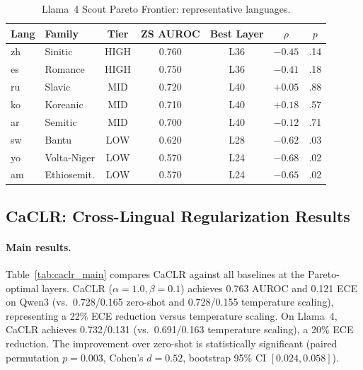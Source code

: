 \documentclass[11pt,a4paper]{article}
\begin{document}
\begin{table}[t]
\centering
\caption{Llama~4 Scout Pareto Frontier: representative languages.}
\label{tab:llama_pareto}
\small
\begin{tabular}{llccccc}
\toprule
\textbf{Lang} & \textbf{Family} & \textbf{Tier} & \textbf{ZS AUROC} & \textbf{Best Layer} & \textbf{$\rho$} & \textbf{$p$} \\
\midrule
zh & Sinitic    & HIGH & 0.760 & L36 & $-0.45$ & .14 \\
es & Romance    & HIGH & 0.750 & L36 & $-0.41$ & .18 \\
ru & Slavic     & MID  & 0.720 & L40 & $+0.05$ & .88 \\
ko & Koreanic   & MID  & 0.710 & L40 & $+0.18$ & .57 \\
ar & Semitic    & MID  & 0.700 & L40 & $-0.12$ & .71 \\
sw & Bantu      & LOW  & 0.620 & L28 & $-0.62$ & .03 \\
yo & Volta-Niger& LOW  & 0.570 & L24 & $-0.68$ & .02 \\
am & Ethiosemit.& LOW  & 0.570 & L24 & $-0.65$ & .02 \\
\bottomrule
\end{tabular}
\end{table}

\subsection{CaCLR: Cross-Lingual Regularization Results}
\label{sec:caclr_results}

\paragraph{Main results.}
Table~\ref{tab:caclr_main} compares CaCLR against all baselines at the Pareto-optimal layers.
CaCLR ($\alpha = 1.0, \beta = 0.1$) achieves 0.763 AUROC and 0.121 ECE on Qwen3 (vs.\ 0.728/0.165 zero-shot and 0.728/0.155 temperature scaling), representing a 22\% ECE reduction versus temperature scaling.
On Llama~4, CaCLR achieves 0.732/0.131 (vs.\ 0.691/0.163 temperature scaling), a 20\% ECE reduction.
The improvement over zero-shot is statistically significant (paired permutation $p = 0.003$, Cohen's $d = 0.52$, bootstrap 95\% CI $[0.024, 0.058]$).
\end{document}
